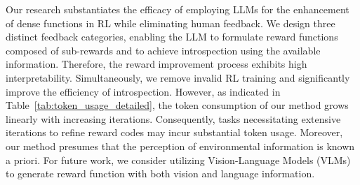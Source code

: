 \documentclass{article}
\theoremstyle{plain}
\theoremstyle{definition}
\theoremstyle{remark}
\begin{document}
Our research substantiates the efficacy of employing LLMs for the enhancement of dense functions in RL while eliminating human feedback. We design three distinct feedback categories, enabling the LLM to formulate reward functions composed of sub-rewards and to achieve introspection using the available information. Therefore, the reward improvement process exhibits high interpretability. Simultaneously, we remove invalid RL training and significantly improve the efficiency of introspection. 
However, as indicated in Table~\ref{tab:token_usage_detailed}, the token consumption of our method grows linearly with increasing iterations. Consequently, tasks necessitating extensive iterations to refine reward codes may incur substantial token usage. Moreover, our method presumes that the perception of environmental information is known a priori.
For future work, we consider utilizing Vision-Language Models (VLMs) to generate reward function with both vision and language information.
\end{document}
